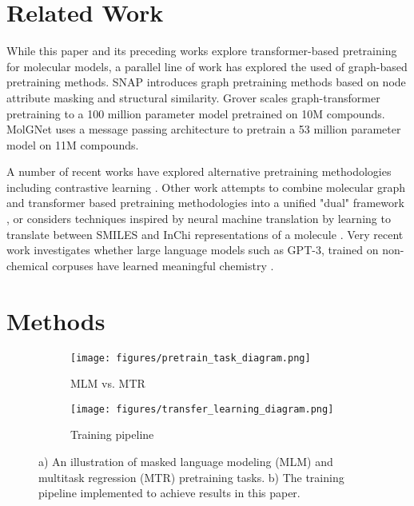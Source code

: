 \documentclass{article}
\begin{document}
\section{Related Work}

While this paper and its preceding works explore transformer-based pretraining for molecular models, a parallel line of work has explored the used of graph-based pretraining methods. SNAP \cite{hu2019strategies} introduces graph pretraining methods based on node attribute masking and structural similarity. Grover \cite{rong2020self} scales graph-transformer pretraining to a 100 million parameter model pretrained on 10M compounds. MolGNet \cite{li2020learn} uses a message passing architecture to pretrain a 53 million parameter model on 11M compounds. 

A number of recent works have explored alternative pretraining methodologies including contrastive learning \cite{wang2022molecular}. Other work attempts to combine molecular graph and transformer based pretraining methodologies into a unified "dual" framework \cite{zhu2021dual}, or considers techniques inspired by neural machine translation by learning to translate between SMILES and InChi representations of a molecule \cite{winter2019learning}. Very recent work investigates whether large language models such as GPT-3, trained on non-chemical corpuses have learned meaningful chemistry \cite{white2022large}.





\section{Methods}

\begin{figure}
     \centering
     \begin{subfigure}[b]{0.45\textwidth}
         \centering
         \texttt{[image: figures/pretrain\_task\_diagram.png]}
         \caption{MLM vs. MTR}
         \label{fig:pretraining task diagram}
     \end{subfigure}
     \hfill
     \begin{subfigure}[b]{0.45\textwidth}
         \centering
         \texttt{[image: figures/transfer\_learning\_diagram.png]}
         \caption{Training pipeline}
         \label{fig:training pipeline}
     \end{subfigure}
        \caption{a) An illustration of masked language modeling (MLM) and multitask regression (MTR) pretraining tasks. b) The training pipeline implemented to achieve results in this paper.}
        \label{fig:mlm and mtr}
\end{figure}
\end{document}

